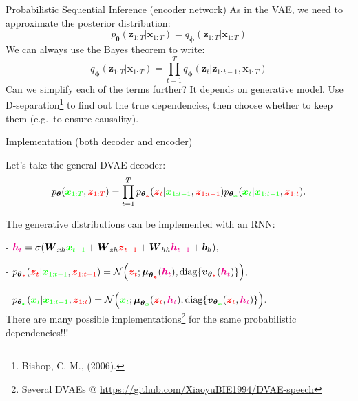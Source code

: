 \documentclass[11pt,aspectratio=169,usenames,dvipsnames]{beamer}
\newcommand{\bs}{\boldsymbol}
\begin{document}
\begin{frame}{Probabilistic Sequential Inference (encoder network)}
 As in the VAE, we need to approximate the posterior distribution:
 \[ p_{\bs{\theta}}(\bs{z}_{1:T}|\bs{x}_{1:T}) = q_{\bs{\phi}}(\bs{z}_{1:T}|\bs{x}_{1:T})\]\pause
 We can always use the Bayes theorem to write:
 \[q_{\bs{\phi}}(\bs{z}_{1:T}|\bs{x}_{1:T}) = \prod_{t=1}^T q_{\bs{\phi}}(\bs{z}_{t}|\bs{z}_{1:t-1},\bs{x}_{1:T})\]
 Can we simplify each of the terms further? It depends on generative model. Use \alert{D-separation}\footnote{Bishop, C. M., (2006).} to find out the true dependencies, then choose whether to keep them (e.g.\ to ensure causality).
\end{frame}

\begin{frame}{Implementation (both decoder and encoder)}

Let's take the general DVAE decoder:
$$ p_{\bs{\theta}}({\color{green}\bs{x}_{1:T}}, {\color{red}\bs{z}_{1:T}} ) =  \prod_{t=1}^T  p_{\bs{\theta}_{\color{red}\bs{z}}}({\color{red}\bs{z}_t} | {\color{green}\bs{x}_{1:t-1}}, {\color{red}\bs{z}_{1:t-1}} ) p_{\bs{\theta}_{\color{green}\bs{x}}}({\color{green}\bs{x}_t} | {\color{green}\bs{x}_{1:t-1}}, {\color{red}\bs{z}_{1:t}} ).$$\vspace{-4mm}\pause

The generative distributions can be implemented with an RNN:

- ${\color{magenta}\bs{h}_{t}} = \sigma(\bs{W}_{xh} {\color{green}\bs{x}_{t-1}} + \bs{W}_{zh} {\color{red}\bs{z}_{t-1}}  + \bs{W}_{hh} {\color{magenta}\bs{h}_{t-1}} + \bs{b}_h),$

- $p_{\bs{\theta}_{\color{red}\bs{z}}}({\color{red}\bs{z}_t} | {\color{green}\bs{x}_{1:t-1}}, {\color{red}\bs{z}_{1:t-1}} ) = \mathcal{N}\Big({\color{red}\bs{z}_t}; \boldsymbol{\mu}_{\bs{\theta}_{\color{red}\bs{z}}}( {\color{magenta}\bs{h}_{t}} ), \text{diag}\{ \bs{v}_{\bs{\theta}_{\color{red}\bs{z}}}( {\color{magenta}\bs{h}_{t}}) \} \Big), $

- $ p_{\bs{\theta}_{\color{green}\bs{x}}}({\color{green}\bs{x}_t} | {\color{green}\bs{x}_{1:t-1}}, {\color{red}\bs{z}_{1:t}} ) = \mathcal{N}\Big({\color{green}\bs{x}_t}; \boldsymbol{\mu}_{\bs{\theta}_{\color{green}\bs{x}}}({\color{red}\bs{z}_t}, {\color{magenta}\bs{h}_{t}}), \text{diag}\{ \bs{v}_{\bs{\theta}_{\color{green}\bs{x}}}({\color{red}\bs{z}_t},  {\color{magenta}\bs{h}_{t}})\} \Big).$\vspace{4mm}\\

There are \alert{many possible} implementations\footnote{Several DVAEs @ \url{https://github.com/XiaoyuBIE1994/DVAE-speech}} for the same probabilistic dependencies!!!
\end{frame}
\end{document}
